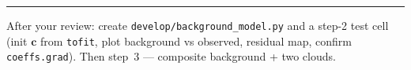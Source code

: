 \documentclass[10pt,a4paper]{article}
\newcommand{\co}[1]{{\small\texttt{#1}}}
\begin{document}
\vspace{1pt}
{\footnotesize\color{gry}\rule{\textwidth}{0.4pt}}
{\sffamily\color{gry}\footnotesize After your review: create \co{develop/background\_model.py} and a step-2 test cell (init $\mathbf c$ from \co{tofit}, plot background vs observed, residual map, confirm \co{coeffs.grad}). Then step~3 --- composite background + two clouds.}
\end{document}

